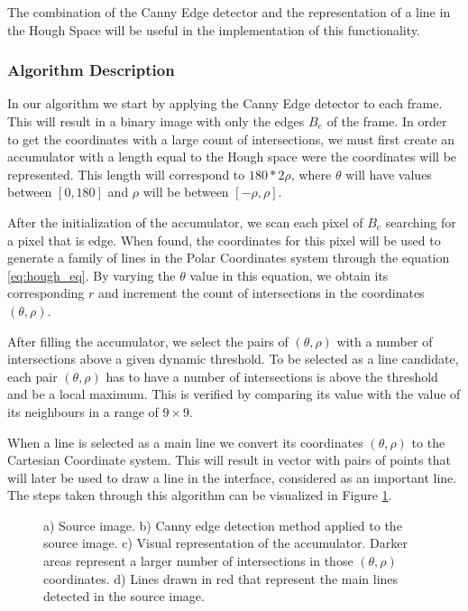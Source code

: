 The combination of the Canny Edge detector and the representation of a line in the Hough Space will be useful in the implementation of this functionality.

\subsubsection{Algorithm Description}

In our algorithm we start by applying the Canny Edge detector to each frame. This will result in a binary image with only the edges $B_{e}$ of the frame. In order to get the coordinates with a large count of intersections, we must first create an accumulator with a length equal to the Hough space were the coordinates will be represented. This length will correspond to $180 * 2\rho$, where $\theta$ will have values between $[0,180]$ and $\rho$ will be between $[-\rho,\rho]$.

After the initialization of the accumulator, we scan each pixel of $B_{e}$ searching for a pixel that is edge. When found, the coordinates for this pixel will be used to generate a family of lines in the Polar Coordinates system through the equation \ref{eq:hough_eq}. By varying the $\theta$ value in this equation, we obtain its corresponding $r$ and increment the count of intersections in the coordinates $(\theta,\rho)$.

After filling the accumulator, we select the pairs of $(\theta,\rho)$ with a number of intersections above a given dynamic threshold. To be selected as a line candidate, each pair $(\theta,\rho)$ has to have a number of intersections is above the threshold and be a local maximum. This is verified by comparing its value with the value of its neighbours in a range of $9 \times 9$.

When a line is selected as a main line we convert its coordinates $(\theta,\rho)$ to the Cartesian Coordinate system. This will result in vector with pairs of points that will later be used to draw a line in the interface, considered as an important line. The steps taken through this algorithm can be visualized in Figure \ref{fig:hough_pipeline}.

\begin{figure}[htb]
	\centering
	\begin{minipage}[b][9cm]{0.5\textwidth}
  		\centering
  		\vfill
  		\vfill
  		\renewcommand{\thesubfigure}{(d)}
  	\end{minipage}
  	\renewcommand{\thesubfigure}{(c)}
	\caption{a) Source image. b) Canny edge detection method applied to the source image. c) Visual representation of the accumulator. Darker areas represent a larger number of intersections in those $(\theta,\rho)$ coordinates. d) Lines drawn in red that represent the main lines detected in the source image.}
    \label{fig:hough_pipeline}
\end{figure}

